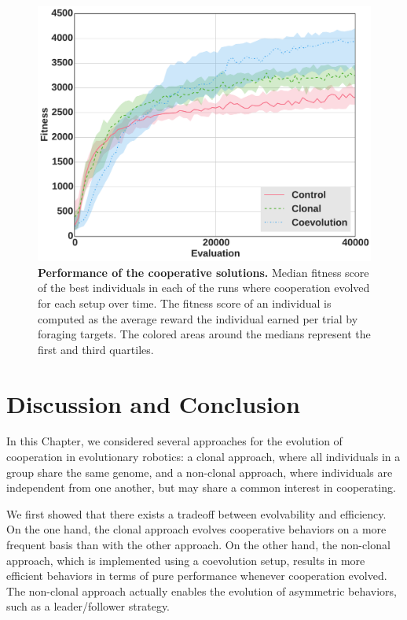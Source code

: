     \begin{figure}[h]
      \begin{center}
        \includegraphics[scale = 0.4]{fig/ArticleRob1/fitnessRecyclingStags.pdf}
        \caption{\textbf{Performance of the cooperative solutions.}
        Median fitness score of the best individuals in each of the runs where cooperation evolved for each setup over time. The fitness score of an individual is computed as the average reward the individual earned per trial by foraging targets. The colored areas around the medians represent the first and third quartiles.}
        \label{fig:RecyclingFitness}
        \end{center}
    \end{figure}

\section{Discussion and Conclusion}

  In this Chapter, we considered several approaches for the evolution of cooperation in evolutionary robotics: a clonal approach, where all individuals in a group share the same genome, and a non-clonal approach, where individuals are independent from one another, but may share a common interest in cooperating. 

  We first showed that there exists a tradeoff between evolvability and efficiency. On the one hand, the clonal approach evolves cooperative behaviors on a more frequent basis than with the other approach. On the other hand, the non-clonal approach, which is implemented using a coevolution setup, results in more efficient behaviors in terms of pure performance whenever cooperation evolved. The non-clonal approach actually enables the evolution of asymmetric behaviors, such as a leader/follower strategy.

